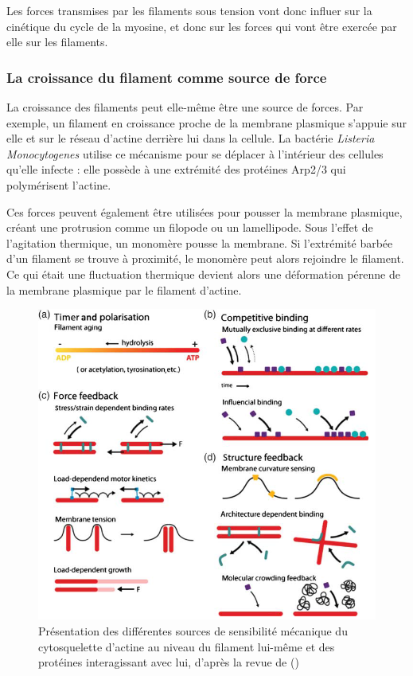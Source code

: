 Les forces transmises par les filaments sous tension vont donc influer sur la cinétique du cycle de la myosine, et donc sur les forces qui vont être exercée par elle sur les filaments. 

\subsubsection{La croissance du filament comme source de force}

La croissance des filaments peut elle-même être une source de forces. Par exemple, un filament en croissance proche de la membrane plasmique s'appuie sur elle et sur le réseau d'actine derrière lui dans la cellule. La bactérie \textit{Listeria Monocytogenes} utilise ce mécanisme pour se déplacer à l'intérieur des cellules qu'elle infecte : elle possède à une extrémité des protéines Arp2/3 qui polymérisent l'actine. 

Ces forces peuvent également être utilisées pour pousser la membrane plasmique, créant une protrusion comme un filopode ou un lamellipode. Sous l'effet de l'agitation thermique, un monomère pousse la membrane. Si l'extrémité barbée d'un filament se trouve à proximité, le monomère peut alors rejoindre le filament. Ce qui était une fluctuation thermique devient alors une déformation pérenne de la membrane plasmique par le filament d'actine. 

\begin{figure}[h!]
\includegraphics[scale=0.7]{Actine_phenomenon.png}
\caption{Présentation des différentes sources de sensibilité mécanique du cytosquelette d'actine au niveau du filament lui-même et des protéines interagissant avec lui, d'après la revue de (\cite{huber_emergent_2013})}
\end{figure}



